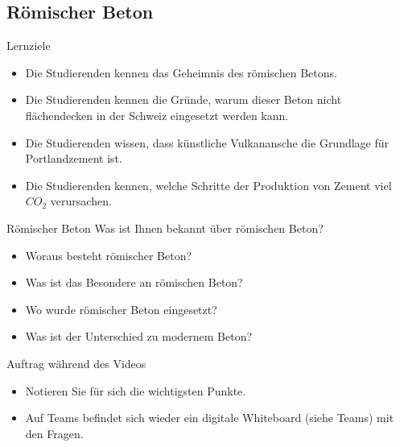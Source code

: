 \subsection{Römischer Beton}
\begin{frame}{Lernziele}
    \begin{myLernziele}
        \begin{itemize}
            \item[\textbullet] Die Studierenden kennen das Geheimnis des römischen Betons.
            \item[\textbullet] Die Studierenden kennen die Gründe, warum dieser Beton nicht flächendecken in der Schweiz eingesetzt werden kann.
            \item[\textbullet] Die Studierenden wissen, dass künstliche Vulkanansche die Grundlage für Portlandzement ist.
            \item[\textbullet] Die Studierenden kennen, welche Schritte der Produktion von Zement viel $CO_2$ verursachen.
        \end{itemize}
    \end{myLernziele}

\end{frame}


\begin{frame}{Römischer Beton}
    Was ist Ihnen bekannt über römischen Beton?
    \begin{itemize}
        \item[\textbullet]  Woraus besteht römischer Beton?
        \item[\textbullet]  Was ist das Besondere an römischen Beton?
        \item[\textbullet]  Wo wurde römischer Beton eingesetzt?
        \item[\textbullet]  Was ist der Unterschied zu modernem Beton?
    \end{itemize}

\end{frame}



\begin{frame}{Auftrag während des Videos}
    \begin{itemize}
        \item Notieren Sie für sich die wichtigsten Punkte.
        \item Auf Teams befindet sich wieder ein digitale Whiteboard (siehe Teams) mit den Fragen.
    \end{itemize}
\end{frame}


